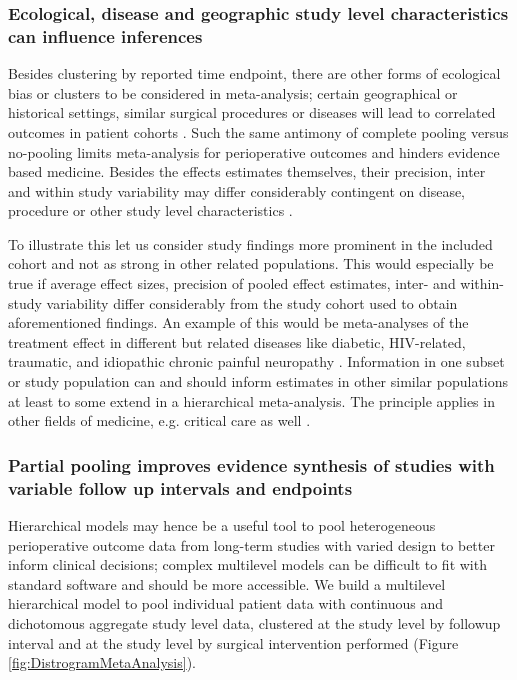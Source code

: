 \documentclass[11pt,notitlepage]{article}
\begin{document}
\subsubsection*{Ecological, disease and geographic study level characteristics can influence inferences}
Besides clustering by reported time endpoint, there are other forms of ecological bias or clusters to be considered in meta-analysis; certain geographical or historical settings, similar surgical procedures or diseases will lead to correlated outcomes in patient cohorts \cite{Abroug2011,Andreae2013,Andreae2015,Roth2015CriticalCare}. Such the same antimony of complete pooling versus no-pooling limits meta-analysis for perioperative outcomes and hinders evidence based medicine. Besides the effects estimates themselves, their precision, inter and within study variability may differ considerably contingent on disease, procedure or other study level characteristics \cite{Andreae2013,Andreae2015,Roth2015CriticalCare}.

To illustrate this let us consider study findings more prominent in the included cohort and not as strong in other related populations. This would especially be true if average effect sizes, precision of pooled effect estimates, inter- and within-study variability differ considerably from the study cohort used to obtain aforementioned findings. An example of this would be meta-analyses of the treatment effect in different but related diseases like diabetic, HIV-related, traumatic, and idiopathic chronic painful neuropathy \cite{Andreae2015}. Information in one subset or study population can and should inform estimates in other similar populations at least to some extend in a hierarchical meta-analysis. The principle applies in other fields of medicine, e.g. critical care as well \cite{Roth2015CriticalCare}.

\subsubsection*{Partial pooling improves evidence synthesis of studies with variable follow up intervals and endpoints}
 
Hierarchical models may hence be a useful tool to pool heterogeneous perioperative outcome data from long-term studies with varied design to better inform clinical decisions\cite{AndreaeJohnsonAbstract2013,Spiegelhalter2004bayesian}; complex multilevel models can be difficult to fit with standard software and should be more accessible. We build a multilevel hierarchical model to pool individual patient data with continuous and dichotomous aggregate study level data, clustered at the study level by followup interval and at the study level by surgical intervention performed (Figure \ref{fig:DistrogramMetaAnalysis}).
\end{document}
